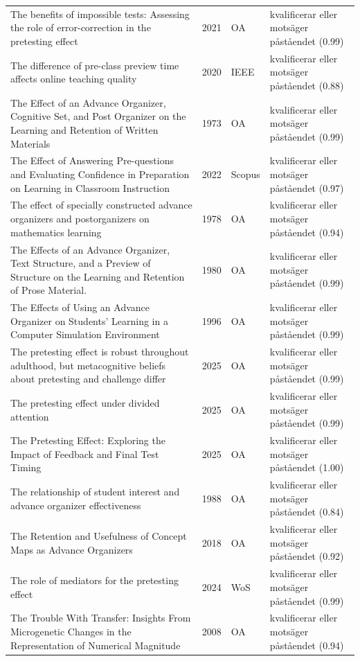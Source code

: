 \begin{longtable}{@{}%
  >{\raggedright\arraybackslash}p{}c%
  >{\raggedright\arraybackslash}p{}%
  >{\raggedright\arraybackslash}p{}@{}}
The benefits of impossible tests: Assessing the role of error-correction in the pretesting effect & 2021 & OA & kvalificerar eller motsäger påståendet (0.99) \\
The difference of pre-class preview time affects online teaching quality & 2020 & IEEE & kvalificerar eller motsäger påståendet (0.88) \\
The Effect of an Advance Organizer, Cognitive Set, and Post Organizer on the Learning and Retention of Written Materials & 1973 & OA & kvalificerar eller motsäger påståendet (0.99) \\
The Effect of Answering Pre-questions and Evaluating Confidence in Preparation on Learning in Classroom Instruction & 2022 & Scopus & kvalificerar eller motsäger påståendet (0.97) \\
The effect of specially constructed advance organizers and postorganizers on mathematics learning & 1978 & OA & kvalificerar eller motsäger påståendet (0.94) \\
The Effects of an Advance Organizer, Text Structure, and a Preview of Structure on the Learning and Retention of Prose Material. & 1980 & OA & kvalificerar eller motsäger påståendet (0.99) \\
The Effects of Using an Advance Organizer on Students' Learning in a Computer Simulation Environment & 1996 & OA & kvalificerar eller motsäger påståendet (0.99) \\
The pretesting effect is robust throughout adulthood, but metacognitive beliefs about pretesting and challenge differ & 2025 & OA & kvalificerar eller motsäger påståendet (0.99) \\
The pretesting effect under divided attention & 2025 & OA & kvalificerar eller motsäger påståendet (0.99) \\
The Pretesting Effect: Exploring the Impact of Feedback and Final Test Timing & 2025 & OA & kvalificerar eller motsäger påståendet (1.00) \\
The relationship of student interest and advance organizer effectiveness & 1988 & OA & kvalificerar eller motsäger påståendet (0.84) \\
The Retention and Usefulness of Concept Maps as Advance Organizers & 2018 & OA & kvalificerar eller motsäger påståendet (0.92) \\
The role of mediators for the pretesting effect & 2024 & WoS & kvalificerar eller motsäger påståendet (0.99) \\
The Trouble With Transfer: Insights From Microgenetic Changes in the Representation of Numerical Magnitude & 2008 & OA & kvalificerar eller motsäger påståendet (0.94) \\

\end{longtable}
